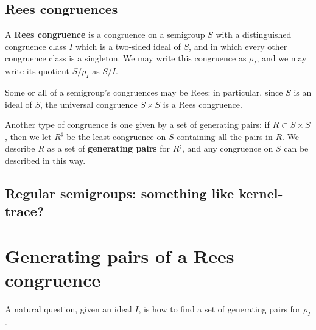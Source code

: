 \subsection{Rees congruences}
A \textbf{Rees congruence} is a congruence on a semigroup $S$ with a distinguished
congruence class $I$ which is a two-sided ideal of $S$, and in which every other
congruence class is a singleton.  We may write this congruence as $\rho_I$, and
we may write its quotient $S/\rho_I$ as $S/I$.

Some or all of a semigroup's congruences may be Rees: in particular, since $S$
is an ideal of $S$, the universal congruence $S \times S$ is a Rees congruence.

Another type of congruence is one given by a set of generating pairs: if $R
\subset S \times S$, then we let $R^\sharp$ be the least congruence on $S$
containing all the pairs in $R$.  We describe $R$ as a set of \textbf{generating
  pairs} for $R^\sharp$, and any congruence on $S$ can be described in this way.

\subsection{Regular semigroups: something like kernel-trace?}

\section{Generating pairs of a Rees congruence}
\label{sec:rees-to-pairs}
A natural question, given an ideal $I$, is how to find a set of generating pairs
for $\rho_I$.

